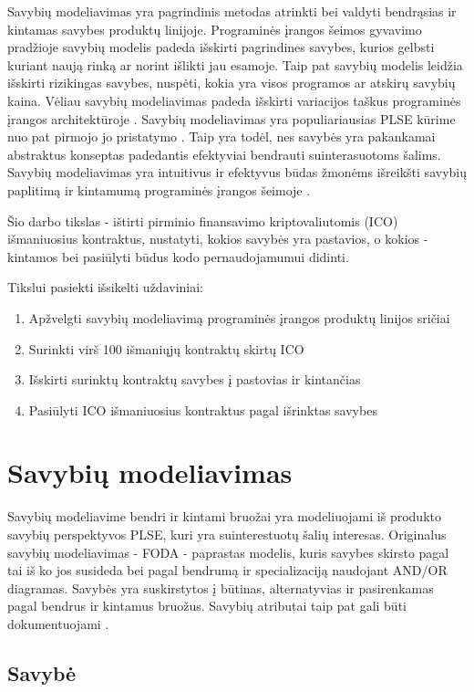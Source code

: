 \documentclass{VUMIFPSkursinis}
\begin{document}
Savybių modeliavimas yra pagrindinis metodas atrinkti bei valdyti bendrąsias ir kintamas savybes produktų linijoje. Programinės įrangos šeimos gyvavimo pradžioje savybių modelis padeda išskirti pagrindines savybes, kurios gelbsti kuriant naują rinką ar  norint išlikti jau esamoje. Taip pat savybių modelis leidžia išskirti rizikingas savybes, nuspėti, kokia yra visos programos ar atskirų savybių kaina. Vėliau savybių modeliavimas padeda išskirti variacijos taškus programinės įrangos architektūroje \cite{Czarnecki2004}. Savybių modeliavimas yra populiariausias PLSE kūrime nuo pat pirmojo jo pristatymo \cite{Kang1990}. Taip yra todėl, nes savybės yra pakankamai abstraktus konseptas padedantis efektyviai bendrauti suinterasuotoms šalims. Savybių modeliavimas yra intuitivus ir efektyvus būdas žmonėms išreikšti savybių paplitimą ir kintamumą programinės įrangos šeimoje \cite{Kang2013}. 

Šio darbo tikslas - ištirti pirminio finansavimo kriptovaliutomis (ICO) išmaniuosius kontraktus, nustatyti, kokios savybės yra pastavios, o kokios - kintamos bei pasiūlyti būdus kodo pernaudojamumui didinti. 

Tikslui pasiekti išsikelti uždaviniai:
\begin{enumerate}
\item Apžvelgti savybių modeliavimą programinės įrangos produktų linijos sričiai 
\item Surinkti virš 100 išmaniųjų kontraktų skirtų ICO
\item Išskirti surinktų kontraktų savybes į pastovias ir kintančias
\item Pasiūlyti ICO išmaniuosius kontraktus pagal išrinktas savybes
\end{enumerate}

\section{Savybių modeliavimas}
Savybių modeliavime bendri ir kintami bruožai yra modeliuojami iš produkto savybių perspektyvos PLSE, kuri yra suinterestuotų šalių interesas. Originalus savybių modeliavimas - FODA \cite{Kang1990} - paprastas modelis, kuris savybes skirsto pagal tai iš ko jos susideda bei pagal bendrumą ir specializaciją naudojant AND/OR  diagramas. Savybės yra suskirstytos į būtinas, alternatyvias ir pasirenkamas pagal bendrus ir kintamus bruožus. Savybių atributai taip pat gali būti dokumentuojami \cite{Kang2013}.

\subsection{Savybė}
\end{document}
